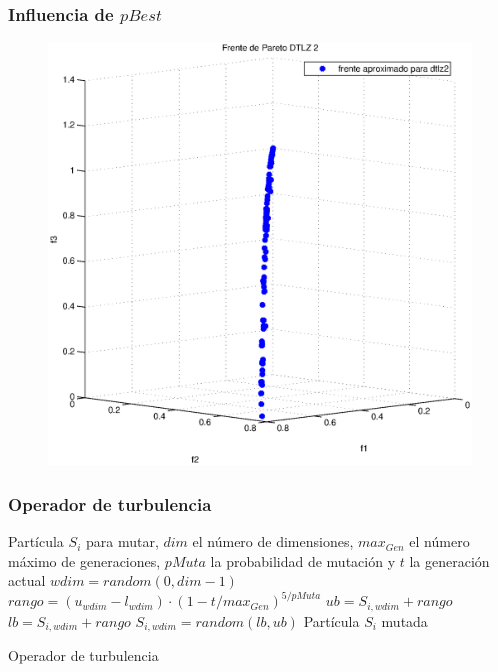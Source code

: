 \documentclass[10pt,compress]{beamer}
\begin{document}
\begin{frame}
	\frametitle{Influencia de $pBest$}	
	\begin{figure}[H]
	\centering
	\includegraphics[scale=0.45]{idtlz2.eps}
    
      \end{figure}
\end{frame}
\begin{frame}
	\frametitle{Operador de turbulencia}	
	 \begin{algorithm}[H]			
			Part\'icula $S_i$ para mutar, $dim$ el n\'umero de dimensiones, $max_{Gen}$ el n\'umero m\'aximo de generaciones,
	      $pMuta$ la probabilidad de mutaci\'on y $t$ la generaci\'on actual\;			
			 {
				$wdim = random(0, dim-1)$\;
				$rango = \left(u_{wdim} - l_{wdim}\right)\cdot \left(1 - t/max_{Gen} \right)^{5/pMuta}$\;
				$ub = S_{i,wdim} + rango$\;
				$lb = S_{i,wdim} + rango$\;
			$S_{i,wdim} = random\left(lb,ub\right)$\;
	}
	\Return Part\'icula $S_i$ mutada\;  
	\caption{Operador de turbulencia}
  \end{algorithm}

\end{frame}
\end{document}
